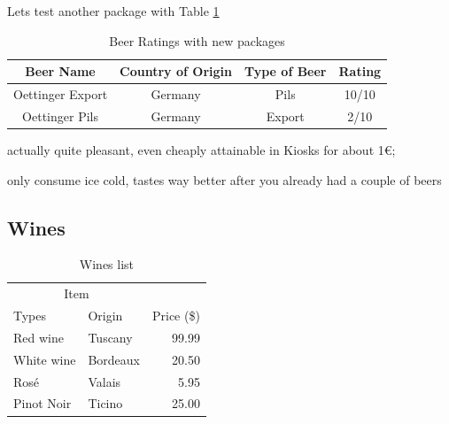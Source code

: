 \documentclass{article}
\begin{document}
\par
Lets test another package with Table \ref{table:2}
\begin{table}[h]
\begin{center}
\begin{threeparttable}
\begin{tabular}{c c c c}
    \toprule
    \textbf{Beer Name} & \textbf{Country of Origin} & \textbf{Type of Beer} & \textbf{Rating} \\ 
    \midrule
      Oettinger Export\tnote{1}   & Germany & Pils & 10/10 \\
      Oettinger Pils\tnote{2}   & Germany & Export & 2/10 \\ 
      \bottomrule
\end{tabular}
\begin{tablenotes}
\item[1] actually quite pleasant, even cheaply attainable in Kiosks for about 1€; \item[2] only consume ice cold, tastes way better after you already had a couple of beers
\end{tablenotes}
\end{threeparttable}
\end{center}
\caption{Beer Ratings with new packages}{}
\label{table:2}
\end{table}

\newpage
\subsection{Wines}
\begin{table}[h]
\centering
\begin{tabular}{llr}
\hline
\multicolumn{2}{c}{Item} \\
\cline{1-2}
Types    & Origin & Price (\$) \\
\hline
Red wine      & Tuscany     & 99.99      \\
White wine       & Bordeaux     & 20.50      \\
Rosé       & Valais     & 5.95      \\
Pinot Noir & Ticino      & 25.00       \\
\hline
\end{tabular}
\caption{Wines list}
 \label{table:3}
\end{table}
\end{document}
